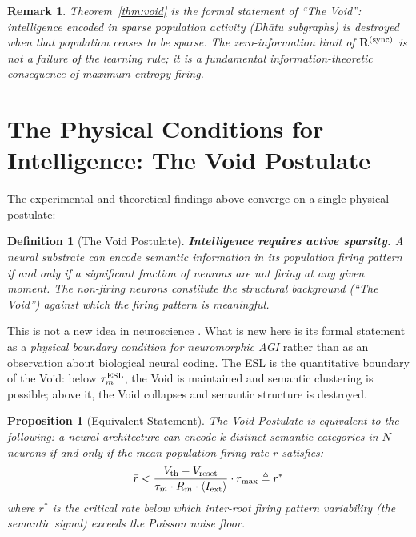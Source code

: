 \documentclass{article}
\newtheorem{definition}{Definition}
\newtheorem{proposition}{Proposition}
\newtheorem{remark}{Remark}
\begin{document}
\begin{remark}
Theorem~\ref{thm:void} is the formal statement of ``The Void'': intelligence encoded in sparse population activity (Dh\={a}tu subgraphs) is destroyed when that population ceases to be sparse. The zero-information limit of $\mathbf{R}^{(\rm sync)}$ is not a failure of the learning rule; it is a fundamental information-theoretic consequence of maximum-entropy firing.
\end{remark}

\section{The Physical Conditions for Intelligence: The Void Postulate}
\label{sec:void}

The experimental and theoretical findings above converge on a single physical postulate:

\begin{definition}[The Void Postulate]
\textbf{Intelligence requires active sparsity.} A neural substrate can encode semantic information in its population firing pattern if and only if a significant fraction of neurons are \textit{not} firing at any given moment. The non-firing neurons constitute the structural background (``The Void'') against which the firing pattern is meaningful.
\end{definition}

This is not a new idea in neuroscience \citep{foldiak1990, olshausen1996}. What is new here is its formal statement as a \textit{physical boundary condition for neuromorphic AGI} rather than as an observation about biological neural coding. The ESL is the quantitative boundary of the Void: below $\tau_m^{\rm ESL}$, the Void is maintained and semantic clustering is possible; above it, the Void collapses and semantic structure is destroyed.

\begin{proposition}[Equivalent Statement]
The Void Postulate is equivalent to the following: a neural architecture can encode $k$ distinct semantic categories in $N$ neurons if and only if the mean population firing rate $\bar{r}$ satisfies:
\begin{equation}
\bar{r} < \frac{V_{\rm th} - V_{\rm reset}}{\tau_m \cdot R_m \cdot \langle I_{\rm ext} \rangle} \cdot r_{\max} \triangleq r^*
\label{eq:rstar}
\end{equation}
where $r^*$ is the critical rate below which inter-root firing pattern variability (the semantic signal) exceeds the Poisson noise floor.
\end{proposition}
\end{document}
